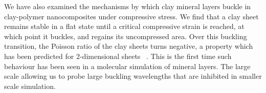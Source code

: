We have also examined the mechanisms by which clay mineral layers buckle in clay-polymer nanocomposites under compressive stress. We find that a clay sheet remains stable in a flat state until a critical compressive strain is reached, at which point it buckles, and regains its uncompressed area. Over this buckling transition, the Poisson ratio of the clay sheets turns negative, a property which has been predicted for 2-dimensional sheets ~\cite{Soft_Matter2}. This is the first time such behaviour has been seen in a molecular simulation of mineral layers. The large scale allowing us to probe large buckling wavelengths that are inhibited in smaller scale simulation. 